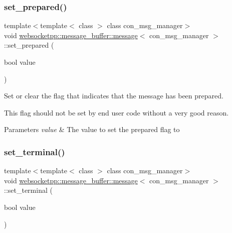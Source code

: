 \subsubsection{\texorpdfstring{set\+\_\+prepared()}{set\_prepared()}}
{\footnotesize\ttfamily template$<$template$<$ class $>$ class con\+\_\+msg\+\_\+manager$>$ \\
void \mbox{\hyperlink{classwebsocketpp_1_1message__buffer_1_1message}{websocketpp\+::message\+\_\+buffer\+::message}}$<$ con\+\_\+msg\+\_\+manager $>$\+::set\+\_\+prepared (\begin{DoxyParamCaption}\item[{bool}]{value }\end{DoxyParamCaption})\hspace{0.3cm}{\ttfamily [inline]}}



Set or clear the flag that indicates that the message has been prepared. 

This flag should not be set by end user code without a very good reason.


\begin{DoxyParams}{Parameters}
{\em value} & The value to set the prepared flag to \\
\hline
\end{DoxyParams}
\mbox{\label{classwebsocketpp_1_1message__buffer_1_1message_abcc812dfce52ff72f57a0d0908d33867}} 
\subsubsection{\texorpdfstring{set\+\_\+terminal()}{set\_terminal()}}
{\footnotesize\ttfamily template$<$template$<$ class $>$ class con\+\_\+msg\+\_\+manager$>$ \\
void \mbox{\hyperlink{classwebsocketpp_1_1message__buffer_1_1message}{websocketpp\+::message\+\_\+buffer\+::message}}$<$ con\+\_\+msg\+\_\+manager $>$\+::set\+\_\+terminal (\begin{DoxyParamCaption}\item[{bool}]{value }\end{DoxyParamCaption})\hspace{0.3cm}{\ttfamily [inline]}}



